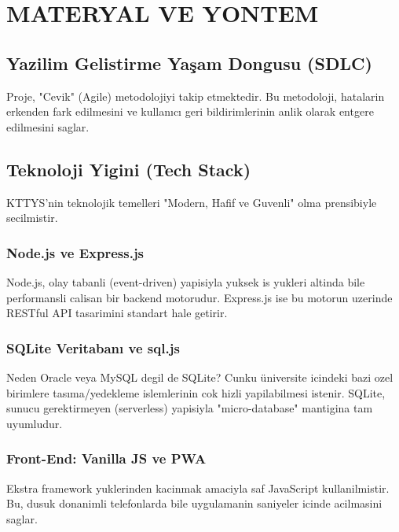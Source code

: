 \documentclass[12pt,a4paper,oneside]{report}
\begin{document}
\chapter{MATERYAL VE YONTEM}
\label{chap:materyal}

\section{Yazilim Gelistirme Yaşam Dongusu (SDLC)}

Proje, "Cevik" (Agile) metodolojiyi takip etmektedir. Bu metodoloji, hatalarin erkenden fark edilmesini ve kullanıcı geri bildirimlerinin anlik olarak entgere edilmesini saglar.

\section{Teknoloji Yigini (Tech Stack)}

KTTYS'nin teknolojik temelleri "Modern, Hafif ve Guvenli" olma prensibiyle secilmistir.

\subsection{Node.js ve Express.js}
Node.js, olay tabanli (event-driven) yapisiyla yuksek is yukleri altinda bile performansli calisan bir backend motorudur. Express.js ise bu motorun uzerinde RESTful API tasarimini standart hale getirir.

\subsection{SQLite Veritabanı ve sql.js}
Neden Oracle veya MySQL degil de SQLite? Cunku üniversite icindeki bazi ozel birimlere tasıma/yedekleme islemlerinin cok hizli yapilabilmesi istenir. SQLite, sunucu gerektirmeyen (serverless) yapisiyla "micro-database" mantigina tam uyumludur.

\subsection{Front-End: Vanilla JS ve PWA}
Ekstra framework yuklerinden kacinmak amaciyla saf JavaScript kullanilmistir. Bu, dusuk donanimli telefonlarda bile uygulamanin saniyeler icinde acilmasini saglar.
\end{document}
